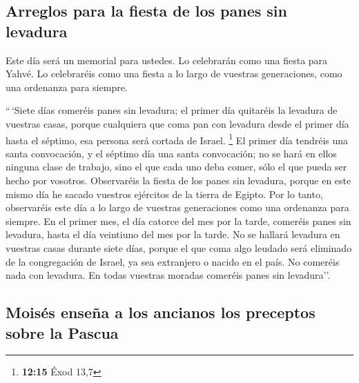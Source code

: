 \begin{paracol}{2}
\hypertarget{arreglos-para-la-fiesta-de-los-panes-sin-levadura}{%
\subsection{Arreglos para la fiesta de los panes sin
levadura}\label{arreglos-para-la-fiesta-de-los-panes-sin-levadura}}

 Este día será un memorial para ustedes. Lo celebrarán
como una fiesta para Yahvé. Lo celebraréis como una fiesta a lo largo de
vuestras generaciones, como una ordenanza para siempre.

 ``\,`Siete días comeréis panes sin levadura; el primer
día quitaréis la levadura de vuestras casas, porque cualquiera que coma
pan con levadura desde el primer día hasta el séptimo, esa persona será
cortada de Israel. \footnote{\textbf{12:15} Éxod 13,7} 
El primer día tendréis una santa convocación, y el séptimo día una santa
convocación; no se hará en ellos ninguna clase de trabajo, sino el que
cada uno deba comer, sólo el que pueda ser hecho por vosotros.
 Observaréis la fiesta de los panes sin levadura, porque
en este mismo día he sacado vuestros ejércitos de la tierra de Egipto.
Por lo tanto, observaréis este día a lo largo de vuestras generaciones
como una ordenanza para siempre.  En el primer mes, el
día catorce del mes por la tarde, comeréis panes sin levadura, hasta el
día veintiuno del mes por la tarde.  No se hallará
levadura en vuestras casas durante siete días, porque el que coma algo
leudado será eliminado de la congregación de Israel, ya sea extranjero o
nacido en el país.  No comeréis nada con levadura. En
todas vuestras moradas comeréis panes sin levadura''.

\hypertarget{moisuxe9s-enseuxf1a-a-los-ancianos-los-preceptos-sobre-la-pascua}{%
\subsection{Moisés enseña a los ancianos los preceptos sobre la
Pascua}\label{moisuxe9s-enseuxf1a-a-los-ancianos-los-preceptos-sobre-la-pascua}}


\end{paracol}
